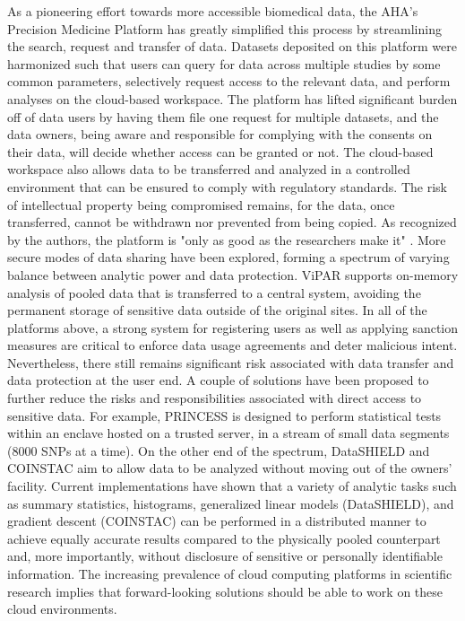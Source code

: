 \documentclass[letter]{bib}
\newcounter{example}[subsection]
\begin{document}
	As a pioneering effort towards more accessible biomedical data, the AHA's Precision Medicine Platform \citep{Kass-Hout:2018:American} has greatly simplified this process by streamlining the search, request and transfer of data. Datasets deposited on this platform were harmonized such that users can query for data across multiple studies by some common parameters, selectively request access to the relevant data, and perform analyses on the cloud-based workspace. The platform has lifted significant burden off of data users by having them file one request for multiple datasets, and the data owners, being aware and responsible for complying with the consents on their data, will decide whether access can be granted or not. The cloud-based workspace also allows data to be transferred and analyzed in a controlled environment that can be ensured to comply with regulatory standards. The risk of intellectual property being compromised remains, for the data, once transferred, cannot be withdrawn nor prevented from being copied. As recognized by the authors, the platform is "only as good as the researchers make it" \citep{Kass-Hout:2018:American}.
	More secure modes of data sharing have been explored, forming a spectrum of varying balance between analytic power and data protection. ViPAR \citep{Carter:2016:ViPAR} supports on-memory analysis of pooled data that is transferred to a central system, avoiding the permanent storage of sensitive data outside of the original sites.  In all of the platforms above, a strong system for registering users as well as applying sanction measures are critical to enforce data usage agreements and deter malicious intent. Nevertheless, there still remains significant risk associated with data transfer and data protection at the user end.
	A couple of solutions have been proposed to further reduce the risks and responsibilities associated with direct access to sensitive data. For example, PRINCESS \citep{Chen:2017:PRINCESS} is designed to perform statistical tests within an enclave hosted on a trusted server, in a stream of small data segments (8000 SNPs at a time). On the other end of the spectrum, DataSHIELD \citep{Gaye:2014:DataSHIELD, Wilson:2017:DataSHIELD} and COINSTAC \citep{Plis:2016:COINSTAC} aim to allow data to be analyzed without moving out of the owners' facility. Current implementations have shown that a variety of analytic tasks such as summary statistics, histograms, generalized linear models (DataSHIELD), and gradient descent (COINSTAC) can be performed in a distributed manner to achieve equally accurate results compared to the physically pooled counterpart and, more importantly, without disclosure of sensitive or personally identifiable information. The increasing prevalence of cloud computing platforms in scientific research \citep{Langmead:2018:Cloud} implies that forward-looking solutions should be able to work on these cloud environments.
	
\end{document}
